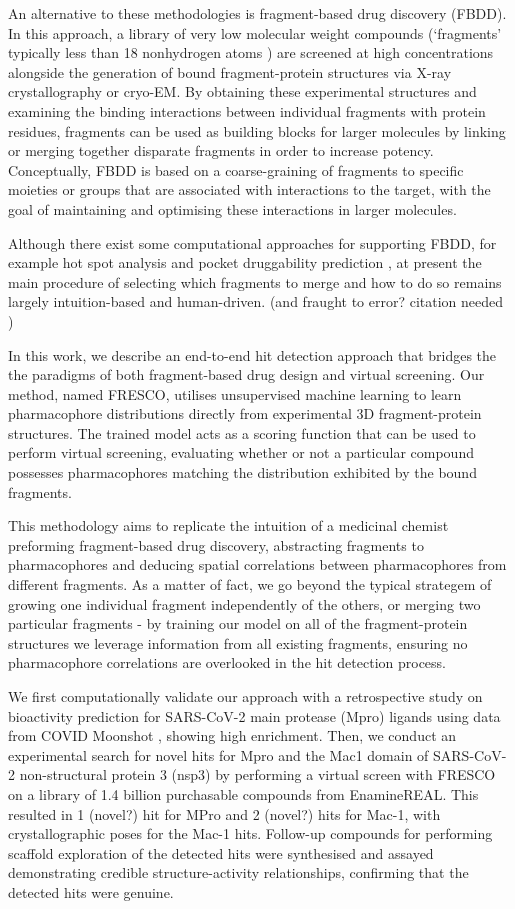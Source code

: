 \documentclass[journal=jacsat,manuscript=article]{achemso}
\begin{document}
An alternative to these methodologies is fragment-based drug discovery (FBDD). In this approach, a library of very low molecular weight compounds (`fragments' typically less than 18 nonhydrogen atoms \cite{David2017FBLD}) are screened at high concentrations alongside the generation of bound fragment-protein structures via X-ray crystallography or cryo-EM. By obtaining these experimental structures and examining the binding interactions between individual fragments with protein residues, fragments can be used as building blocks for larger molecules by linking or merging together disparate fragments in order to increase potency. Conceptually, FBDD is based on a coarse-graining of fragments to specific moieties or groups that are associated with interactions to the target, with the goal of maintaining and optimising these interactions in larger molecules.

 Although there exist some computational approaches for supporting FBDD, for example hot spot analysis and pocket druggability prediction \cite{deSouza2020InSilicoFBDD}, at present the main procedure of selecting which fragments to merge and how to do so remains largely intuition-based and human-driven. (and fraught to error? citation needed \cite{?})

In this work, we describe an end-to-end hit detection approach that bridges the the paradigms of both fragment-based drug design and virtual screening. Our method, named FRESCO, utilises unsupervised machine learning to learn pharmacophore distributions directly from experimental 3D fragment-protein structures. The trained model acts as a scoring function that can be used to perform virtual screening, evaluating whether or not a particular compound possesses pharmacophores matching the distribution exhibited by the bound fragments. 

This methodology aims to replicate the intuition of a medicinal chemist preforming fragment-based drug discovery, abstracting fragments to pharmacophores and deducing spatial correlations between pharmacophores from different fragments. As a matter of fact, we go beyond the typical strategem of growing one individual fragment independently of the others, or merging two particular fragments - by training our model on all of the fragment-protein structures we leverage information from all existing fragments, ensuring no pharmacophore correlations are overlooked in the hit detection process.

We first computationally validate our approach with a retrospective study on bioactivity prediction for SARS-CoV-2 main protease (Mpro) ligands using data from COVID Moonshot \cite{Moonshot2022}, showing high enrichment. Then, we conduct an experimental search for novel hits for Mpro and the Mac1 domain of SARS-CoV-2 non-structural protein 3 (nsp3) by performing a virtual screen with FRESCO on a library of 1.4 billion purchasable compounds from EnamineREAL. This resulted in 1 (novel?) hit for MPro and 2 (novel?) hits for Mac-1, with crystallographic poses for the Mac-1 hits. Follow-up compounds for performing scaffold exploration of the detected hits were synthesised and assayed demonstrating credible structure-activity relationships, confirming that the detected hits were genuine.
\end{document}
